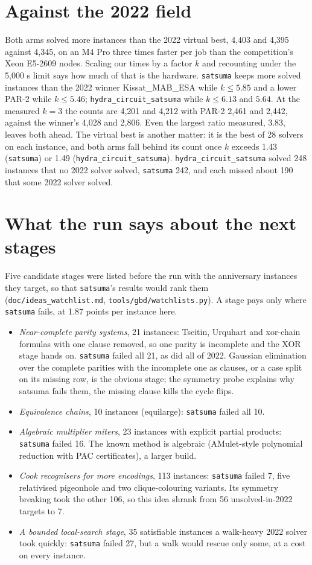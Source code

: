 \documentclass[10pt]{article}
\newcommand{\hcs}{\texttt{hydra\_circuit\_satsuma}}
\newcommand{\sats}{\texttt{satsuma}}
\newcommand{\partwo}{PAR-2}
\begin{document}
\section{Against the 2022 field}
\label{sec:field}

Both arms solved more instances than the 2022 virtual best, 4,403 and
4,395 against 4,345, on an M4 Pro three times faster per job than the
competition's Xeon E5-2609 nodes. Scaling our
times by a factor $k$ and recounting under the 5,000 s limit says how much
of that is the hardware. \sats{} keeps more solved instances than the 2022
winner Kissat\_MAB\_ESA while $k \le 5.85$ and a lower \partwo{} while
$k \le 5.46$; \hcs{} while $k \le 6.13$ and $5.64$. At the measured
$k = 3$ the counts are 4,201 and 4,212 with \partwo{} 2,461 and 2,442,
against the winner's 4,028 and 2,806. Even the largest ratio measured,
3.83, leaves both ahead. The virtual best is another matter: it is the
best of 28 solvers on each instance, and both arms fall behind its count
once $k$ exceeds 1.43 (\sats{}) or 1.49 (\hcs{}). \hcs{} solved 248
instances that no 2022 solver solved, \sats{} 242, and each missed about
190 that some 2022 solver solved.

\section{What the run says about the next stages}

Five candidate stages were listed before the run with the anniversary
instances they target, so that \sats{}'s results would rank them
(\texttt{doc/ideas\_watchlist.md}, \texttt{tools/gbd/watchlists.py}). A
stage pays only where \sats{} fails, at 1.87 points per instance here.

\begin{itemize}
\item \emph{Near-complete parity systems}, 21 instances: Tseitin, Urquhart
  and xor-chain formulas with one clause removed, so one parity is
  incomplete and the XOR stage hands on. \sats{} failed all 21, as did all
  of 2022. Gaussian elimination over the complete parities with the
  incomplete one as clauses, or a case split on its missing row, is the
  obvious stage; the symmetry probe explains why satsuma fails them, the
  missing clause kills the cycle flips.
\item \emph{Equivalence chains}, 10 instances (equilarge): \sats{} failed
  all 10.
\item \emph{Algebraic multiplier miters}, 23 instances with explicit
  partial products: \sats{} failed 16. The known method is algebraic
  (AMulet-style polynomial reduction with PAC certificates), a larger
  build.
\item \emph{Cook recognisers for more encodings}, 113 instances: \sats{}
  failed 7, five relativised pigeonhole and two clique-colouring
  variants. Its symmetry breaking took the other 106, so this idea shrank
  from 56 unsolved-in-2022 targets to 7.
\item \emph{A bounded local-search stage}, 35 satisfiable instances a
  walk-heavy 2022 solver took quickly: \sats{} failed 27, but a walk would
  rescue only some, at a cost on every instance.
\end{itemize}
\end{document}
